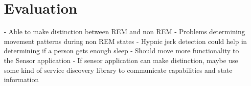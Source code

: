 \chapter{Evaluation} %
\label{cha:evaluation}
- Able to make distinction between REM and non REM
- Problems determining movement patterns during non REM states
- Hypnic jerk detection could help in determining if a person gets enough sleep
- Should move more functionality to the Sensor application
- If sensor application can make distinction, maybe use some kind of service discovery library to communicate capabilities and state information
